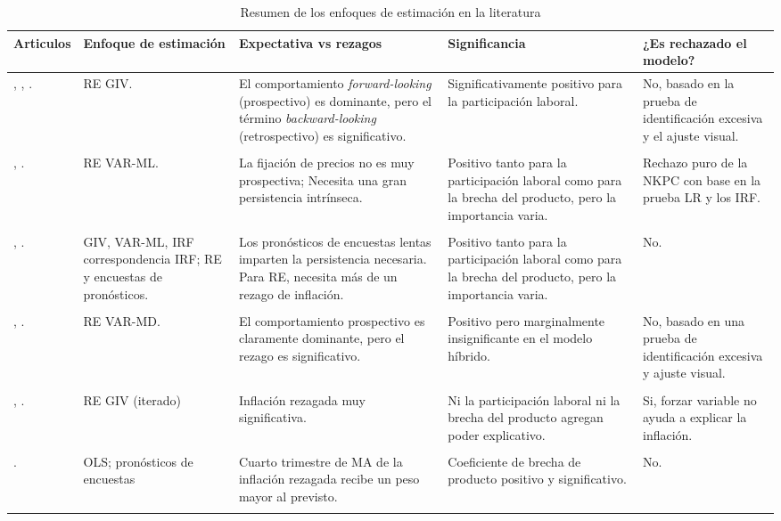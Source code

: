 \begin{table}%
  \centering
    \caption{Resumen de los enfoques de estimación en la literatura}
  \resizebox{16.5cm}{!} {
    \begin{tabular}{p{3cm} p{3cm} p{5cm} p{5cm} p{5cm}}
    \hline
  Articulos & Enfoque de estimación & Expectativa vs rezagos & Significancia & ¿Es rechazado el modelo?  \\
 \hline
  \hline
\cite{gali1999inflation}, \cite{gali2001european}, \cite{gali2005monetary}.    & RE GIV. & El comportamiento \textit{forward-looking} (prospectivo) es dominante, pero el término \textit{backward-looking} (retrospectivo) es significativo. & Significativamente positivo para la participación laboral. & No, basado en la prueba de identificación excesiva y el ajuste visual. \\ \\
     \cite{fuhrer1995inflation}, \cite{fuhrer1997importance}.  & RE VAR-ML. & La fijación de precios no es muy prospectiva; Necesita una gran persistencia intrínseca. & Positivo tanto para la participación laboral como para la brecha del producto, pero la importancia varia. & Rechazo puro de la NKPC con base en la prueba LR y los IRF. \\ \\
     \cite{roberts1995new}, \cite{roberts2005well}.       & GIV, VAR-ML, IRF correspondencia IRF; RE y encuestas de pronósticos. & Los pronósticos de encuestas lentas imparten la persistencia necesaria. Para RE, necesita más de un rezago de inflación. & Positivo tanto para la participación laboral como para la brecha del producto, pero la importancia varia. & No. \\ \\
     \cite{sbordone2002prices}, \cite{sbordone2005expected}.    & RE VAR-MD. & El comportamiento prospectivo es claramente dominante, pero el rezago es significativo. & Positivo pero marginalmente insignificante en el modelo híbrido. & No, basado en una prueba de identificación excesiva y ajuste visual. \\ \\
     \cite{rudd2005new}, \cite{rudd2007modeling}.       & RE GIV (iterado) & Inflación rezagada muy significativa. & Ni la participación laboral ni la brecha del producto agregan poder explicativo. & Si, forzar variable no ayuda a explicar la inflación. \\ \\
    \cite{rudebusch2002assessing}.       & OLS; pronósticos de encuestas & Cuarto trimestre de MA de la inflación rezagada recibe un peso mayor al previsto. & Coeficiente de brecha de producto positivo y significativo. & No. \\ \\

\end{tabular}}
\end{table}
